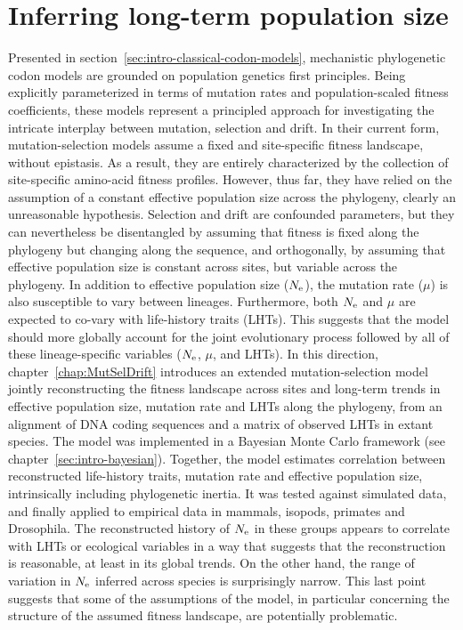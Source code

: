 \section{Inferring long-term population size}
\label{sec-goals:MutSelDrift}

Presented in section~\ref{sec:intro-classical-codon-models}, mechanistic phylogenetic \gls{codon} models are grounded on population genetics first principles.
Being explicitly parameterized in terms of mutation rates and population-scaled fitness coefficients, these models represent a principled approach for investigating the intricate interplay between mutation, selection and drift.
In their current form, mutation-selection models assume a fixed and site-specific fitness landscape, without epistasis.
As a result, they are entirely characterized by the collection of site-specific amino-acid fitness profiles.
However, thus far, they have relied on the assumption of a constant \gls{effective population size} across the phylogeny, clearly an unreasonable hypothesis.
Selection and drift are confounded parameters, but they can nevertheless be disentangled by assuming that fitness is fixed along the phylogeny but changing along the sequence, and orthogonally, by assuming that \gls{effective population size} is constant across sites, but variable across the phylogeny.
In addition to \gls{effective population size} ($N_{\text{e}}$), the mutation rate ($\mu$) is also susceptible to vary between lineages.
Furthermore, both $N_{\text{e}}$ and $\mu$ are expected to co-vary with life-history traits (\acrshort{LHT}s).
This suggests that the model should more globally account for the joint evolutionary process followed by all of these lineage-specific variables ($N_{\text{e}}$, $\mu$, and \acrshort{LHT}s).
In this direction, chapter~\ref{chap:MutSelDrift} introduces an extended mutation-selection model jointly reconstructing the fitness landscape across sites and long-term trends in \gls{effective population size}, mutation rate and \acrshort{LHT}s along the phylogeny, from an alignment of \acrshort{DNA} coding sequences and a matrix of observed \acrshort{LHT}s in extant species.
The model was implemented in a Bayesian Monte Carlo framework (see chapter~\ref{sec:intro-bayesian}).
Together, the model estimates correlation between reconstructed life-history traits, mutation rate and \gls{effective population size}, intrinsically including phylogenetic inertia.
It was tested against simulated data, and finally applied to empirical data in mammals, isopods, primates and Drosophila.
The reconstructed history of $N_{\text{e}}$ in these groups appears to correlate with \acrshort{LHT}s or ecological variables in a way that suggests that the reconstruction is reasonable, at least in its global trends.
On the other hand, the range of variation in $N_{\text{e}}$ inferred across species is surprisingly narrow.
This last point suggests that some of the assumptions of the model, in particular concerning the structure of the assumed fitness landscape, are potentially problematic.



